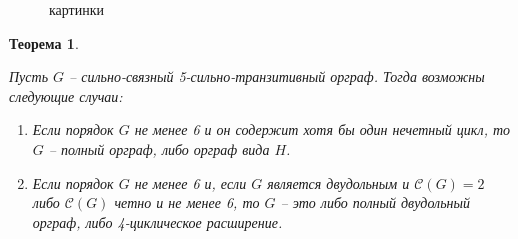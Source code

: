 \documentclass[a4paper,12pt]{article}
\theoremstyle{plain}
\newtheorem{theorem}{Теорема}
\theoremstyle{definition}
\begin{document}
	
		\begin{figure}[htbp]
\centering
{}
\quad
{}
\quad
{}
\quad
{}
\caption{ картинки}

\end{figure}
	
	
	
	
	
	
	
	
	
	        
	\begin{theorem}\label{tzx}
		{\it Пусть $G$ -- сильно-связный 5-сильно-транзитивный орграф. Тогда возможны следующие случаи:
		
		\begin{enumerate}
\item[(1)] Если порядок $G$ не менее 6 и он содержит хотя бы один нечетный цикл, то $G$ -- полный орграф, либо орграф вида $H$.
\item[(2)] Если порядок $G$ не менее 6 и, если $G$ является двудольным и $\mathcal{C}(G) = 2$ либо $\mathcal{C}(G)$ четно и не менее 6, то $G$ -- это либо полный двудольный орграф, либо 4-циклическое расширение.



\end{enumerate}}   
	\end{theorem}
\end{document}
